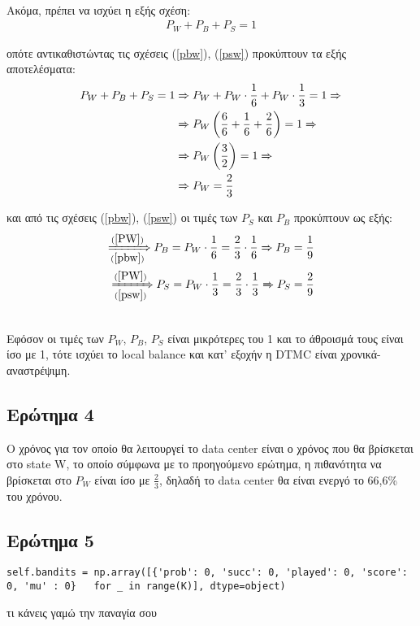 \noindent\\
Ακόμα, πρέπει να ισχύει η εξής σχέση:
\begin{align*}
	P_W + P_B + P_S = 1
\end{align*}

οπότε αντικαθιστώντας τις σχέσεις (\ref{pbw}), (\ref{psw}) προκύπτουν τα εξής αποτελέσματα:
\begin{align}
	P_W + P_B + P_S = 1 &\xRightarrow{} P_W + P_W \cdot \frac{1}{6} + P_W \cdot \frac{1}{3} = 1 \notag \xRightarrow{}\\
						&\xRightarrow{} P_W \left( \frac{6}{6} + \frac{1}{6} +  \frac{2}{6} \right) = 1 \notag \xRightarrow{}\\
						&\xRightarrow{} P_W \left( \frac{3}{2} \right) = 1 \notag \xRightarrow{}\\
						&\xRightarrow{} P_W = \frac{2}{3} \label{PW}
\end{align}

και από τις σχέσεις (\ref{pbw}), (\ref{psw}) οι τιμές των $P_S$ και $P_B$ προκύπτουν ως εξής:
\begin{align}
	\xRightarrow[(\ref{pbw})]{(\ref{PW})} P_B = P_W \cdot \frac{1}{6} = \frac{2}{3} \cdot \frac{1}{6} \xRightarrow{} P_B = \frac{1}{9}\\
	\xRightarrow[(\ref{psw})]{(\ref{PW})} P_S = P_W \cdot \frac{1}{3} = \frac{2}{3} \cdot \frac{1}{3} \xRightarrow{} P_S = \frac{2}{9}
\end{align}


\noindent\\
Εφόσον οι τιμές των $P_W$, $P_B$, $P_S$ είναι μικρότερες του 1 και το άθροισμά τους είναι ίσο με 1, τότε ισχύει το local balance και κατ' εξοχήν η DTMC είναι χρονικά-αναστρέψιμη.

\subsection*{Ερώτημα 4}
\label{ex2q4}

Ο χρόνος για τον οποίο θα λειτουργεί το data center είναι ο χρόνος που θα βρίσκεται στο state W, το οποίο σύμφωνα με το προηγούμενο ερώτημα, η πιθανότητα να βρίσκεται στο $P_W$ είναι ίσο με $\frac{2}{3}$, δηλαδή το data center θα είναι ενεργό το 66,6\% του χρόνου.


\subsection*{Ερώτημα 5}
\label{ex2q5}



\begin{lstlisting}
self.bandits = np.array([{'prob': 0, 'succ': 0, 'played': 0, 'score': 0, 'mu' : 0}   for _ in range(K)], dtype=object)
\end{lstlisting} 

τι κάνεις γαμώ την παναγία σου 